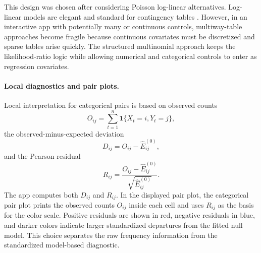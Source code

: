 \documentclass[11pt]{article}
\begin{document}
This design was chosen after considering Poisson log-linear alternatives.
Log-linear models are elegant and standard for contingency tables
\citep{Agresti2013}. However, in an interactive app with
potentially many or continuous controls, multiway-table approaches become
fragile because continuous covariates must be discretized and sparse tables
arise quickly. The structured multinomial approach keeps the likelihood-ratio
logic while allowing numerical and categorical controls to enter as regression
covariates.

\paragraph{Local diagnostics and pair plots.}

Local interpretation for categorical pairs is based on observed counts
\begin{equation*}
O_{ij} = \sum_{t=1}^{n}\mathbf{1}\{X_t=i, Y_t=j\},
\end{equation*}
the observed-minus-expected deviation
\begin{equation*}
D_{ij} = O_{ij} - \widehat{E}^{(0)}_{ij},
\end{equation*}
and the Pearson residual
\begin{equation*}
R_{ij} = \frac{O_{ij} - \widehat{E}^{(0)}_{ij}}{\sqrt{\widehat{E}^{(0)}_{ij}}}.
\end{equation*}
The app computes both $D_{ij}$ and $R_{ij}$. In the displayed pair plot,
the categorical pair plot prints the observed counts $O_{ij}$ inside each cell
and uses $R_{ij}$ as the basis for the color scale. Positive residuals are
shown in red, negative residuals in blue, and darker colors indicate larger
standardized departures from the fitted null model. This choice separates the
raw frequency information from the standardized model-based diagnostic.
\end{document}
